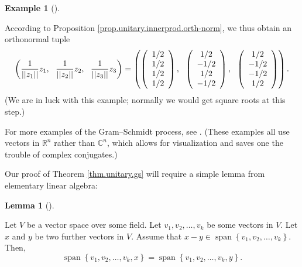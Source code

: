 \documentclass[numbers=enddot,12pt,final,onecolumn,notitlepage]{scrartcl}%
\numberwithin{exer}{subsection}
\theoremstyle{definition}
\newtheorem{lem}[theo]{Lemma}
\newenvironment{lemma}[1][]
{\begin{lem}[#1]\begin{leftbar}}
{\end{leftbar}\end{lem}}
\newtheorem{exam}[theo]{Example}
\newenvironment{example}[1][]
{\begin{exam}[#1]\begin{leftbar}}
{\end{leftbar}\end{exam}}
\begin{document}
\begin{example}
According to Proposition \ref{prop.unitary.innerprod.orth-norm}, we thus
obtain an orthonormal tuple%
\[
\left(  \dfrac{1}{\left\vert \left\vert z_{1}\right\vert \right\vert }%
z_{1},\ \ \dfrac{1}{\left\vert \left\vert z_{2}\right\vert \right\vert }%
z_{2},\ \ \dfrac{1}{\left\vert \left\vert z_{3}\right\vert \right\vert }%
z_{3}\right)  =\left(  \left(
\begin{array}
[c]{c}%
1/2\\
1/2\\
1/2\\
1/2
\end{array}
\right)  ,\ \ \left(
\begin{array}
[c]{c}%
1/2\\
-1/2\\
1/2\\
-1/2
\end{array}
\right)  ,\ \ \left(
\begin{array}
[c]{c}%
1/2\\
-1/2\\
-1/2\\
1/2
\end{array}
\right)  \right)  .
\]
(We are in luck with this example; normally we would get square roots at this step.)
\end{example}

For more examples of the Gram--Schmidt process, see \cite[Week 3,
\S 4]{Bartle14}. (These examples all use vectors in $\mathbb{R}^{n}$ rather
than $\mathbb{C}^{n}$, which allows for visualization and saves one the
trouble of complex conjugates.)

Our proof of Theorem \ref{thm.unitary.gs} will require a simple lemma from
elementary linear algebra:

\begin{lemma}
\label{lem.span-last-vec-change}Let $V$ be a vector space over some field. Let
$v_{1},v_{2},\ldots,v_{k}$ be some vectors in $V$. Let $x$ and $y$ be two
further vectors in $V$. Assume that $x-y\in\operatorname*{span}\left\{
v_{1},v_{2},\ldots,v_{k}\right\}  $. Then,%
\[
\operatorname*{span}\left\{  v_{1},v_{2},\ldots,v_{k},x\right\}
=\operatorname*{span}\left\{  v_{1},v_{2},\ldots,v_{k},y\right\}  .
\]

\end{lemma}
\end{document}
